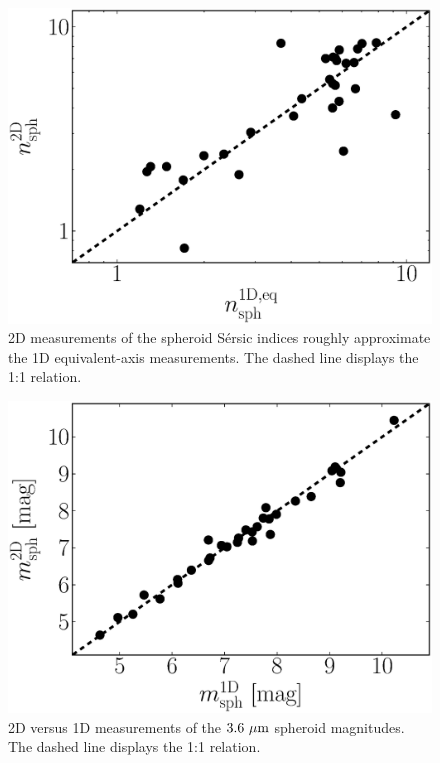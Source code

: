 \documentclass[preprint2]{emulateapj}
\begin{document}
\begin{figure}[h]
\begin{center}
\includegraphics[width=\columnwidth]{images/comparison_n.eps} 
\caption{2D measurements of the spheroid S\'ersic indices roughly approximate the 1D equivalent-axis measurements. 
The dashed line displays the 1:1 relation.}
\label{fig:n1d2d}
\end{center}
\end{figure}

\begin{figure}[h]
\begin{center}
\includegraphics[width=\columnwidth]{images/comparison_mag.eps} 
\caption{2D versus 1D measurements of the $3.6~\rm \mu m$ spheroid magnitudes. The dashed line displays the 1:1 relation.}
\label{fig:mag1d2d}
\end{center}
\end{figure}
\end{document}

